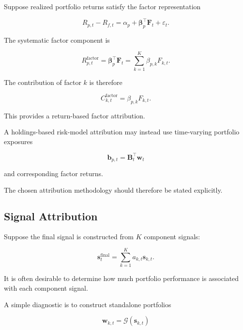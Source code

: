 \documentclass[11pt,a4paper]{article}
\begin{document}
Suppose realized portfolio returns satisfy the factor representation

\begin{equation}
R_{p,t}-R_{f,t}
=
\alpha_p
+
\boldsymbol{\beta}_p^\top
\mathbf{F}_t
+
\varepsilon_t.
\end{equation}

The systematic factor component is

\begin{equation}
\boxed{
R_{p,t}^{\mathrm{factor}}
=
\boldsymbol{\beta}_p^\top
\mathbf{F}_t
=
\sum_{k=1}^{K}
\beta_{p,k}F_{k,t}.
}
\end{equation}

The contribution of factor $k$ is therefore

\begin{equation}
\boxed{
C_{k,t}^{\mathrm{factor}}
=
\beta_{p,k}F_{k,t}.
}
\end{equation}

This provides a return-based factor attribution.

A holdings-based risk-model attribution may instead use time-varying portfolio
exposures

\begin{equation}
\mathbf{b}_{p,t}
=
\mathbf{B}_t^\top\mathbf{w}_t
\end{equation}

and corresponding factor returns.

The chosen attribution methodology should therefore be stated explicitly.


\subsection{Signal Attribution}

Suppose the final signal is constructed from $K$ component signals:

\begin{equation}
\mathbf{s}_t^{\mathrm{final}}
=
\sum_{k=1}^{K}
a_{k,t}
\mathbf{s}_{k,t}.
\end{equation}

It is often desirable to determine how much portfolio performance is associated
with each component signal.

A simple diagnostic is to construct standalone portfolios

\begin{equation}
\mathbf{w}_{k,t}
=
\mathcal{G}
\left(
\mathbf{s}_{k,t}
\right)
\end{equation}
\end{document}
